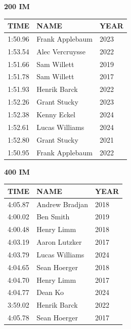 \begin{table}[H]
\centering
\begin{minipage}[t]{0.48\textwidth}
\centering
\textbf{200 IM}\\[0.1cm]
\begin{tabular}{@{}p{1.8cm}p{2.8cm}p{1.2cm}@{}}
\hline
    \textbf{TIME} & \textbf{NAME} & \textbf{YEAR} \\
\hline
    1:50.96 & Frank Applebaum & 2023 \\
    1:53.54 & Alec Vercruysse & 2022 \\
    1:51.66 & Sam Willett & 2019 \\
    1:51.78 & Sam Willett & 2017 \\
    1:51.93 & Henrik Barck & 2022 \\
    1:52.26 & Grant Stucky & 2023 \\
    1:52.38 & Kenny Eckel & 2024 \\
    1:52.61 & Lucas Williams & 2024 \\
    1:52.80 & Grant Stucky & 2021 \\
    1:50.95 & Frank Applebaum & 2022 \\
\hline
\end{tabular}
\end{minipage}\hfill
\begin{minipage}[t]{0.48\textwidth}
\centering
\textbf{400 IM}\\[0.1cm]
\begin{tabular}{@{}p{1.8cm}p{2.8cm}p{1.2cm}@{}}
\hline
    \textbf{TIME} & \textbf{NAME} & \textbf{YEAR} \\
\hline
    4:05.87 & Andrew Bradjan & 2018 \\
    4:00.02 & Ben Smith & 2019 \\
    4:00.48 & Henry Limm & 2018 \\
    4:03.19 & Aaron Lutzker & 2017 \\
    4:03.79 & Lucas Williams & 2024 \\
    4:04.65 & Sean Hoerger & 2018 \\
    4:04.70 & Henry Limm & 2017 \\
    4:04.77 & Dean Ko & 2024 \\
    3:59.02 & Henrik Barck & 2022 \\
    4:05.78 & Sean Hoerger & 2017 \\
\hline
\end{tabular}
\end{minipage}
\end{table}

